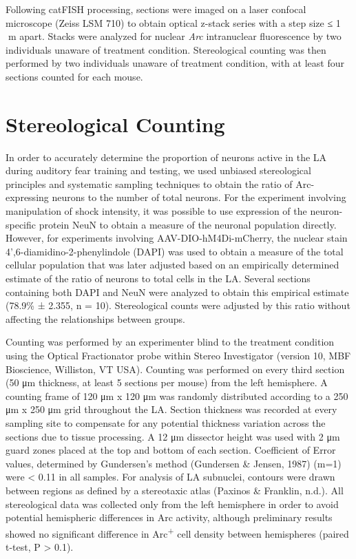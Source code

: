 \documentclass[12pt,a4paper,]{report}
\begin{document}
Following catFISH processing, sections were imaged on a laser confocal
microscope (Zeiss LSM 710) to obtain optical z-stack series with a step
size ≤ 1 m apart. Stacks were analyzed for nuclear \emph{Arc}
intranuclear fluorescence by two individuals unaware of treatment
condition. Stereological counting was then performed by two individuals
unaware of treatment condition, with at least four sections counted for
each mouse.

\section{Stereological Counting}\label{stereological-counting}

In order to accurately determine the proportion of neurons active in the
LA during auditory fear training and testing, we used unbiased
stereological principles and systematic sampling techniques to obtain
the ratio of Arc-expressing neurons to the number of total neurons. For
the experiment involving manipulation of shock intensity, it was
possible to use expression of the neuron-specific protein NeuN to obtain
a measure of the neuronal population directly. However, for experiments
involving AAV-DIO-hM4Di-mCherry, the nuclear stain
4',6-diamidino-2-phenylindole (DAPI) was used to obtain a measure of the
total cellular population that was later adjusted based on an
empirically determined estimate of the ratio of neurons to total cells
in the LA. Several sections containing both DAPI and NeuN were analyzed
to obtain this empirical estimate (78.9\% ± 2.355, n = 10).
Stereological counts were adjusted by this ratio without affecting the
relationships between groups.

Counting was performed by an experimenter blind to the treatment
condition using the Optical Fractionator probe within Stereo
Investigator (version 10, MBF Bioscience, Williston, VT USA). Counting
was performed on every third section (50 μm thickness, at least 5
sections per mouse) from the left hemisphere. A counting frame of 120 μm
x 120 μm was randomly distributed according to a 250 μm x 250 μm grid
throughout the LA. Section thickness was recorded at every sampling site
to compensate for any potential thickness variation across the sections
due to tissue processing. A 12 μm dissector height was used with 2 μm
guard zones placed at the top and bottom of each section. Coefficient of
Error values, determined by Gundersen's method (Gundersen \& Jensen,
1987) (m=1) were \textless{} 0.11 in all samples. For analysis of LA
subnuclei, contours were drawn between regions as defined by a
stereotaxic atlas (Paxinos \& Franklin, n.d.). All stereological data
was collected only from the left hemisphere in order to avoid potential
hemispheric differences in Arc activity, although preliminary results
showed no significant difference in Arc\textsuperscript{+} cell density
between hemispheres (paired t-test, P \textgreater{} 0.1).
\end{document}

